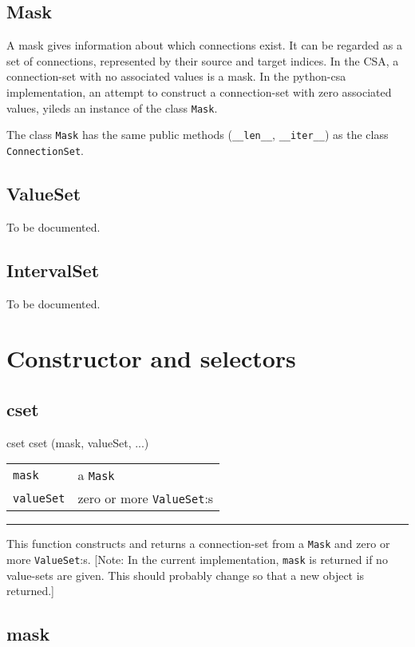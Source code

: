 \documentclass[a4paper,twoside]{report}
\makeatletter
\newenvironment{parameters}%
{\begin{tabular}{@{\hspace{2em}}lp{0.6\textwidth}}}%
{\end{tabular}\par\vspace{1mm}\par\hrule\par\vspace{5mm}}
\newcommand{\cls}[1]{\lstinline|#1|}
\newcommand{\expr}[1]{\lstinline|#1|}
\makeatother
\begin{document}
\subsection{Mask}
A mask gives information about which connections exist.  It can be
regarded as a set of connections, represented by their source and
target indices.  In the CSA, a connection-set with no associated
values is a mask.  In the python-csa implementation, an attempt to
construct a connection-set with zero associated values, yileds an
instance of the class \cls{Mask}.

The class \cls{Mask} has the same public methods (\expr{__len__},
\expr{__iter__}) as the class \cls{ConnectionSet}.

\subsection{ValueSet}
To be documented.

\subsection{IntervalSet}\label{sec:intervalset}
To be documented.

\section{Constructor and selectors}

\subsection{cset}

\begin{head}{cset}
  cset (mask, valueSet, ...)
\end{head}
\begin{parameters}
  \lstinline|mask| &%
  a \lstinline|Mask| \\
  \lstinline|valueSet| &%
  zero or more \lstinline|ValueSet|:s \\
\end{parameters}
This function constructs and returns a connection-set from a
\lstinline|Mask| and zero or more \lstinline|ValueSet|:s.  [Note: In
  the current implementation, \lstinline|mask| is returned if no
  value-sets are given.  This should probably change so that a new
  object is returned.]

\subsection{mask}
\end{document}
